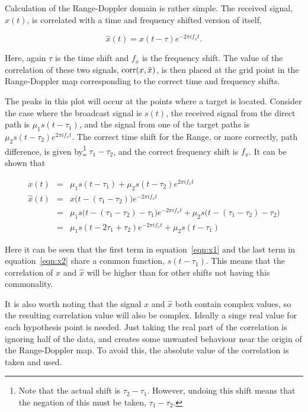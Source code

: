 \documentclass[12pt,openany,a4paper]{book}
\begin{document}
\bigskip

Calculation of the Range-Doppler domain is rather simple. The received signal, $x(t)$, is correlated with a time and frequency shifted version of itself,

\begin{equation}
\hat{x}(t) = x(t-\tau) e^{ -2\pi i f_x t}.
\end{equation}

\bigskip

Here, again $\tau$ is the time shift and $f_x$ is the frequency shift. The value of the correlation of these two signals, $\textnormal{corr}(x,\hat{x})$, is then placed at the grid point in the Range-Doppler map corresponding to the correct time and frequency shifts.

\bigskip

The peaks in this plot will occur at the points where a target is located.
Consider the case where the broadcast signal is $s(t)$, the received signal from the direct path is $\mu_1s(t-\tau_1)$, and the signal from one of the target paths is $\mu_2s(t-\tau_2)e^{2\pi i f_x t}$. The correct time shift for the Range, or more correctly, path difference, is given by\footnote{Note that the actual shift is $\tau_2 - \tau_1$. However, undoing this shift means that the negation of this must be taken, $\tau_1 - \tau_2$.} $\tau_1 - \tau_2$, and the correct frequency shift is $f_x$. It can be shown that

\begin{eqnarray}
\label{eqn:x1}
x(t) & = & \mu_1s(t-\tau_1) + \mu_2s(t-\tau_2)e^{2\pi i f_x t} \\
\hat{x}(t) & = & x\bigg(t-(\tau_1 - \tau_2)\bigg) e^{ -2\pi i f_x t} \\
 & = & \mu_1s\bigg(t-(\tau_1 - \tau_2)-\tau_1\bigg)e^{ -2\pi i f_x t}	 + \mu_2s\bigg(t-(\tau_1 - \tau_2)-\tau_2\bigg) \\
 \label{eqn:x2}
  & = & \mu_1s(t-2\tau_1 + \tau_2)e^{ -2\pi i f_x t} + \mu_2s(t-\tau_1)
\end{eqnarray}

\bigskip

Here it can be seen that the first term in equation~\ref{eqn:x1} and the last term in equation~\ref{eqn:x2} share a common function, $s(t-\tau_1)$. This means that the correlation of $x$ and $\hat{x}$ will be higher than for other shifts not having this commonality.

\bigskip

It is also worth noting that the signal $x$ and $\hat{x}$ both contain complex values, so the resulting correlation value will also be complex. Ideally a singe real value for each hypothesis point is needed. Just taking the real part of the correlation is ignoring half of the data, and creates some unwanted behaviour near the origin of the Range-Doppler map. To avoid this, the absolute value of the correlation is taken and used.
\end{document}

